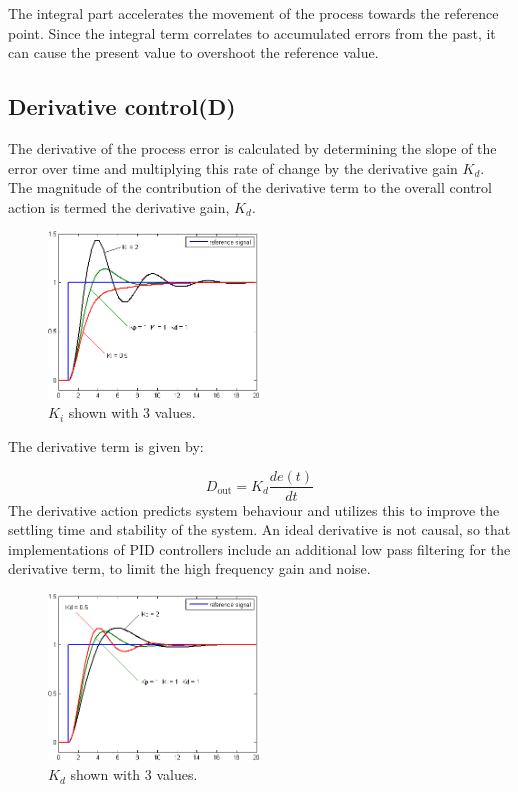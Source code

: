 The integral part accelerates the movement of the process towards the reference point.
Since the integral term correlates to accumulated errors from the past, it can cause the present value to overshoot the reference value.

\subsection {Derivative control(D)} 

The derivative of the process error is calculated by determining the slope of the error over time and multiplying this rate of change by the derivative gain $K_d$. The magnitude of the contribution of the derivative term to the overall control action is termed the derivative gain, $K_d$.
\begin{figure}[h!]
  \centering
  \includegraphics[width=0.5\textwidth]{figures/Change_with_Ki.png}
  
  \caption{$K_i$ shown with 3 values.} 
  \label{PID controller}
\end{figure}

The derivative term is given by:

$$D_{\mathrm{out}}=K_d\frac{de(t)}{dt}$$
The derivative action predicts system behaviour and utilizes this to improve the settling time and stability of the system.
An ideal derivative is not causal, so that implementations of PID controllers include an additional low pass filtering for the derivative term, to limit the high frequency gain and noise.

\begin{figure}[h!]
  \centering
  \includegraphics[width=0.5\textwidth]{figures/Change_with_Kd.png}
  \caption{$K_d$ shown with 3 values.} 
  \label{PID controller}
\end{figure}



